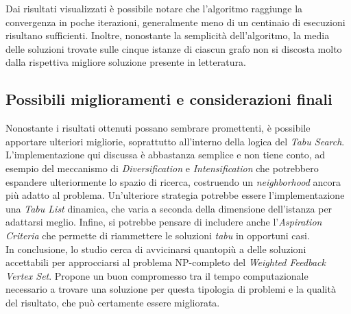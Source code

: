 \documentclass[a4paper, 10pt]{article}
\begin{document}
\noindent
Dai risultati visualizzati è possibile notare che l'algoritmo raggiunge la convergenza in poche iterazioni, generalmente meno di un centinaio di esecuzioni risultano sufficienti. Inoltre, nonostante la semplicità dell'algoritmo, la media delle soluzioni trovate sulle cinque istanze di ciascun grafo non si discosta molto dalla rispettiva migliore soluzione presente in letteratura.  

\subsection{Possibili miglioramenti e considerazioni finali}
Nonostante i risultati ottenuti possano sembrare promettenti, è possibile apportare ulteriori migliorie, soprattutto all'interno della logica del \textit{Tabu Search}. L'implemen\-tazione qui discussa è abbastanza semplice e non tiene conto, ad esempio del meccanismo di \textit{Diversification} e \textit{Intensification} che potrebbero espandere ulteriormente lo spazio di ricerca, costruendo un \textit{neighborhood} ancora più adatto al problema. Un'ulteriore strategia potrebbe essere l'implementazione una \textit{Tabu List} dinamica, che varia a seconda della dimensione dell'istanza per adattarsi meglio. Infine, si potrebbe pensare di includere anche l'\textit{Aspiration Criteria} che permette di riammettere le soluzioni \textit{tabu} in opportuni casi.\\
In conclusione, lo studio cerca di avvicinarsi quantopiù a delle soluzioni accettabili per approcciarsi al problema NP-completo del \textit{Weighted Feedback Vertex Set}. Propone un buon compromesso tra il tempo computazionale necessario a trovare una soluzione per questa tipologia di problemi e la qualità del risultato, che può certamente essere migliorata.  
\end{document}
